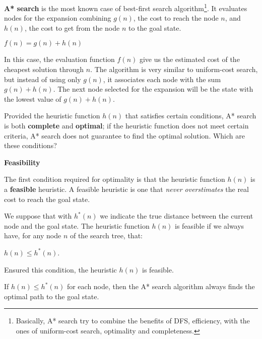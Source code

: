 \textbf{A* search} is the most known case of best-first search algorithm\footnote{Basically, A* search try to combine the benefits of DFS, efficiency, with the ones of
uniform-cost search, optimality and completeness.}. It evaluates nodes for the expansion combining $g(n)$, the cost to reach the node $n$, and 
$h(n)$, the cost to get from the node $n$ to the goal state. \vspace{3.5pt}

\begin{center}
    $f(n) = g(n) + h(n)$
\end{center} \vspace{3.5pt}

In this case, the evaluation function $f(n)$ give us the estimated cost of the cheapest solution through $n$. The algorithm is very similar to uniform-cost search, but instead
of using only $g(n)$, it associates each node with the sum $g(n) + h(n)$. The next node selected for the expansion will be the state with the lowest value of $g(n) + h(n)$. \vspace{3.5pt}

Provided the heuristic function $h(n)$ that satisfies certain conditions, A* search is both \textbf{complete} and \textbf{optimal}; if the heuristic function does not meet 
certain criteria, A* search does not guarantee to find the optimal solution. Which are these conditions? \vspace{3.5pt}

\textbf{Feasibility} \vspace{3.5pt}

The first condition required for optimality is that the heuristic function $h(n)$ is a \textbf{feasible} heuristic. A feasible heuristic is one that \textit{never 
overstimates} the real cost to reach the goal state. \vspace{3.5pt}

We suppose that with $h^*(n)$ we indicate the true distance between the current node and the goal state. The heuristic function $h(n)$ is feasible if we always have, for any
node $n$ of the search tree, that: \vspace{3.5pt}

\begin{center}
    $h(n) \le h^*(n)$.
\end{center} \vspace{3.5pt}

Ensured this condition, the heuristic $h(n)$ is feasible.
\begin{definition}[title={Optimality theorem}]
    If $h(n) \le h^*(n)$ for each node, then the A* search algorithm always finds the optimal path to the goal state.
\end{definition}

